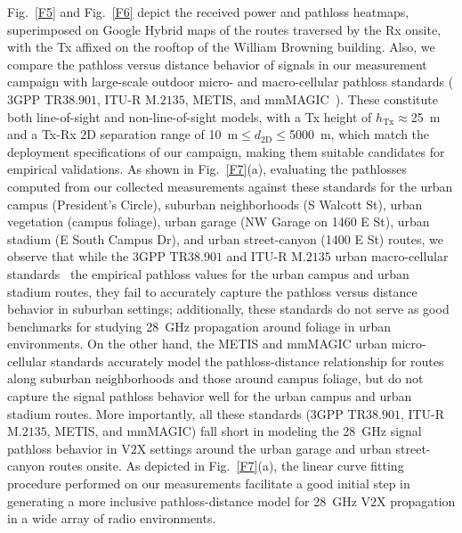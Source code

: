 \documentclass[12pt, draftcls, onecolumn]{IEEEtran}
\begin{document}
Fig.~\ref{F5} and Fig.~\ref{F6} depict the received power and pathloss heatmaps, superimposed on Google Hybrid maps of the routes traversed by the Rx onsite, with the Tx affixed on the rooftop of the William Browning building. Also, we compare the pathloss versus distance behavior of signals in our measurement campaign with large-scale outdoor micro- and macro-cellular pathloss standards ($3$GPP TR$38.901$, ITU-R M$.2135$, METIS, and mmMAGIC~\cite{MacCartneyModelsOverview}). These constitute both line-of-sight and non-line-of-sight models, with a Tx height of $h_{\text{Tx}}{\approx}$\SI{25}{\meter} and a Tx-Rx $2$D separation range of \SI{10}{\meter}${\leq}d_{2\text{D}}{\leq}$\SI{5000}{\meter}, which match the deployment specifications of our campaign, making them suitable candidates for empirical validations. As shown in Fig.~\ref{F7}(a), evaluating the pathlosses computed from our collected measurements against these standards for the urban campus (President's Circle), suburban neighborhoods (S Walcott St), urban vegetation (campus foliage), urban garage (NW Garage on 1460 E St), urban stadium (E South Campus Dr), and urban street-canyon (1400 E St) routes, we observe that while the $3$GPP TR$38.901$ and ITU-R M$.2135$ urban macro-cellular standards~\cite{MacCartneyModelsOverview} the empirical pathloss values for the urban campus and urban stadium routes, they fail to accurately capture the pathloss versus distance behavior in suburban settings; additionally, these standards do not serve as good benchmarks for studying \SI{28}{\giga\hertz} propagation around foliage in urban environments. On the other hand, the METIS and mmMAGIC urban micro-cellular standards accurately model the pathloss-distance relationship for routes along suburban neighborhoods and those around campus foliage, but do not capture the signal pathloss behavior well for the urban campus and urban stadium routes. More importantly, all these standards ($3$GPP TR$38.901$, ITU-R M$.2135$, METIS, and mmMAGIC) fall short in modeling the \SI{28}{\giga\hertz} signal pathloss behavior in V$2$X settings around the urban garage and urban street-canyon routes onsite. As depicted in Fig.~\ref{F7}(a), the linear curve fitting procedure performed on our measurements facilitate a good initial step in generating a more inclusive pathloss-distance model for \SI{28}{\giga\hertz} V$2$X propagation in a wide array of radio environments.
\end{document}
